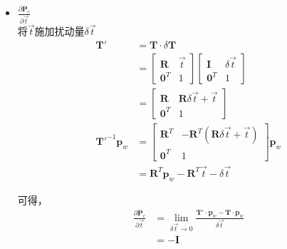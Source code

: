 \documentclass{article}
\begin{document}
\begin{itemize}
	\item $\frac{\partial{\boldsymbol{P}_c}}{\partial{\vec{t}}}$\\
	      将$\vec{t} $施加扰动量$\delta{\vec{t}}$
	      $$
	      \begin{aligned}
	      	\boldsymbol{T}'                      & = \boldsymbol{T} \cdot \delta\boldsymbol{T}            \\&=
	      	\left[
	      	\begin{matrix}
	      	\boldsymbol{R}                       & \vec{t}                                                \\  
	      	\boldsymbol{0}^T                     & 1                                                      
	      	\end{matrix}
	      	\right]	
	      	\left[
	      	\begin{matrix}
	      	\boldsymbol{I}                       & \delta \vec{t}                                         \\ 
	      	\boldsymbol{0}^T                     & 1                                                      
	      	\end{matrix}
	      	\right]\\&=
	      	\left[
	      	\begin{matrix}
	      	\boldsymbol{R}                       & \boldsymbol{R}\delta\vec{t} + \vec{t}                  \\ 
	      	\boldsymbol{0}^T                     & 1                                                      
	      	\end{matrix}
	      	\right]\\
	      	\boldsymbol{T}'^{-1}\boldsymbol{p}_w & =                                                      
	      	\left[
	      	\begin{matrix}
	      	\boldsymbol{R}^T                     & -\boldsymbol{R}^T(\boldsymbol{R}\delta\vec{t}+\vec{t}) \\
	      	\boldsymbol{0}^T                     & 1                                                      
	      	\end{matrix}
	      	\right]\boldsymbol{p}_w \\&=
	      	\boldsymbol{R}^T\boldsymbol{p}_w-\boldsymbol{R}^T\vec{t}-\delta\vec{t}  
	      \end{aligned}
	      $$

可得，
\begin{equation}
	\begin{aligned}
		\frac{\partial{\boldsymbol{P}_c}}{\partial{\vec{t}}} & = \lim_{\delta{\vec{t}}  \rightarrow0}\frac{\boldsymbol{T'} \cdot \boldsymbol{p}_w -\boldsymbol{T}  \cdot \boldsymbol{p}_w}{\delta{\vec{t}}} \\&= 
		-\boldsymbol{I}	
	\end{aligned}
\end{equation}
\end{itemize}
\end{document}
